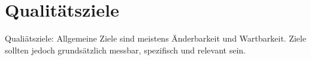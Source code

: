 \section{Qualitätsziele}
Qualiätsziele: Allgemeine Ziele sind meistens Änderbarkeit und Wartbarkeit.
Ziele sollten jedoch grundsätzlich messbar, spezifisch und relevant sein.
